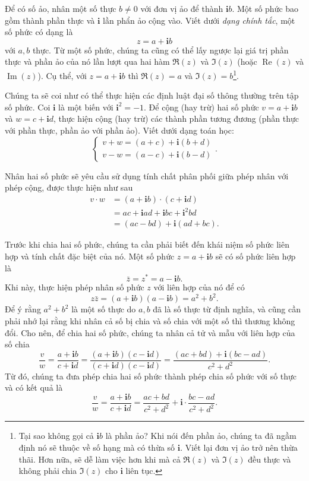 \documentclass[a4paper, titlepage, openany]{book}
\numberwithin{equation}{chapter}
\begin{document}
Để có số ảo, nhân một số thực $b \neq 0$ với đơn vị ảo để thành $\mathbf{i}b$. Một số phức bao gồm thành phần thực và $\mathbf{i}$ lần phẩn ảo cộng vào. Viết dưới \emph{dạng chính tắc}, một số phức có dạng là $$z=a+\mathbf{i}b$$ với $a, b$ thực. Từ một số phức, chúng ta cũng có thể lấy ngược lại giá trị phần thực và phần ảo của nó lần lượt qua hai hàm $\Re{(z)}$ và $\Im{(z)}$ (hoặc $\operatorname*{Re}{(z)}$ và $\operatorname*{Im}{(z)}$). Cụ thể, với $z=a+\mathbf{i}b$ thì $\Re{(z)} = a$ và $\Im{(z)}=b$\footnote{Tại sao không gọi cả $\mathbf{i}b$ là phần ảo? Khi nói đến phần ảo, chúng ta đã ngầm định nó sẽ thuộc về số hạng mà có thừa số $\mathbf{i}$. Viết lại đơn vị ảo trở nên thừa thãi. Hơn nữa, sẽ dễ làm việc hơn khi mà cả $\Re{(z)}$ và $\Im{(z)}$ đều thực và không phải chia $\Im{(z)}$ cho $\mathbf{i}$ liên tục.}.

Chúng ta sẽ coi như có thể thực hiện các định luật đại số thông thường trên tập số phức. Coi $\mathbf{i}$ là một biến với $\mathbf{i}^2 = -1$. Để cộng (hay trừ) hai số phức $v = a + \mathbf{i}b$ và $w = c + \mathbf{i}d$, thực hiện cộng (hay trừ) các thành phần tương đương (phần thực với phần thực, phần ảo với phần ảo). Viết dưới dạng toán học:
\begin{equation*}
   \begin{cases}
      v + w = (a + c) + \mathbf{i}(b + d) \\ 
      v - w = (a - c) + \mathbf{i}(b - d) 
   \end{cases}.
\end{equation*}

Nhân hai số phức sẽ yêu cầu sử dụng tính chất phân phối giữa phép nhân với phép cộng, được thực hiện như sau
\begin{align*}
   v\cdot w&=\left(a + \mathbf{i}b\right)\cdot\left(c + \mathbf{i}d\right) \\
      &= ac + \mathbf{i}ad + \mathbf{i}bc + \mathbf{i}^2 bd \\
      &= (ac - bd) + \mathbf{i}(ad + bc).
\end{align*}

Trước khi chia hai số phức, chúng ta cần phải biết đến khái niệm số phức liên hợp và tính chất đặc biệt của nó. Một số phức $z = a+\mathbf{i}b$ sẽ có số phức liên hợp là $$\bar{z} = z^* = a - \mathbf{i}b.$$ Khi này, thực hiện phép nhân số phức $z$ với liên hợp của nó để có $$z\bar{z} = (a+\mathbf{i}b)(a-\mathbf{i}b) = a^2 + b^2.$$ Để ý rằng $a^2 + b^2$ là một số thực do $a, b$ đã là số thực từ định nghĩa, và cũng cần phải nhớ lại rằng khi nhân cả số bị chia và số chia với một số thì thương không đổi. Cho nên, để chia hai số phức, chúng ta nhân cả tử và mẫu với liên hợp của số chia $$\frac{v}{w} = \frac{a + \mathbf{i}b}{c + \mathbf{i}d} = \frac{\left(a + \mathbf{i}b\right)\left(c - \mathbf{i}d\right)}{\left(c + \mathbf{i}d\right)\left(c - \mathbf{i}d\right)} = \frac{\left(ac+bd\right) + \mathbf{i}\left(bc - ad\right)}{c^2+d^2}.$$ Từ đó, chúng ta đưa phép chia hai số phức thành phép chia số phức với số thực và có kết quả là $$\frac{v}{w} = \frac{a + \mathbf{i}b}{c + \mathbf{i}d} = \frac{ac+bd}{c^2+d^2}+\mathbf{i}\cdot\frac{bc - ad}{c^2+d^2}.$$
\end{document}
